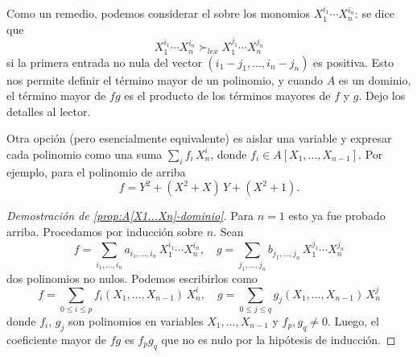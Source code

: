 Como un remedio, podemos considerar el  sobre los
monomios $X_1^{i_1}\cdots X_n^{i_n}$: se dice que
$$X_1^{i_1}\cdots X_n^{i_n} \succ_{lex} X_1^{j_1}\cdots X_n^{j_n}$$
si la primera entrada no nula del vector $(i_1-j_1,\ldots,i_n-j_n)$ es
positiva. Esto nos permite definir el término mayor de un polinomio, y cuando
$A$ es un dominio, el término mayor de $fg$ es el producto de los términos
mayores de $f$ y $g$. Dejo los detalles al lector.

Otra opción (pero esencialmente equivalente) es aislar una variable y expresar
cada polinomio como una suma $\sum_i f_i \, X_n^i$, donde
$f_i \in A [X_1,\ldots,X_{n-1}]$. Por ejemplo, para el polinomio de arriba
$$f = Y^2 + (X^2 + X)\,Y + (X^2 + 1).$$

\begin{proof}[Demostración de \ref{prop:A[X1...Xn]-dominio}]
  Para $n=1$ esto ya fue probado arriba. Procedamos por inducción sobre
  $n$. Sean
  $$f = \sum_{i_1,\ldots,i_n} a_{i_1,\ldots,i_n}\,X_1^{i_1}\cdots X_n^{i_n}, \quad g = \sum_{j_1,\ldots,j_n} b_{j_1,\ldots,j_n}\,X_1^{j_1}\cdots X_n^{j_n}$$
  dos polinomios no nulos. Podemos escribirlos como
  $$f = \sum_{0 \le i \le p} f_i (X_1,\ldots,X_{n-1})\,X_n^i, \quad g = \sum_{0 \le j \le q} g_j (X_1,\ldots,X_{n-1})\,X_n^j$$
  donde $f_i$, $g_j$ son polinomios en variables $X_1,\ldots,X_{n-1}$ y
  $f_p, g_q \ne 0$. Luego, el coeficiente mayor de $fg$ es $f_p g_q$ que no es
  nulo por la hipótesis de inducción.
\end{proof}

\iffalse
Notamos que si
$$X_1^{i_1}\cdots X_n^{i_n} \succ_{lex} X_1^{j_1}\cdots X_n^{j_n},$$
entonces
\begin{equation}
  \label{eqn:lex-orden-monomial}
  (X_1^{i_1}\cdots X_n^{i_n})\cdot (X_1^{k_1}\cdots X_n^{k_n}) \succ_{lex} (X_1^{j_1}\cdots X_n^{j_n})\cdot (X_1^{k_1}\cdots X_n^{k_n}).
\end{equation}
Para un polinomio no nulo
$$f = \sum_{i_1,\ldots,i_n} a_{i_1,\ldots,i_n}\,X_1^{i_1}\cdots X_n^{i_n} \in A [X_1,\ldots,X_n],$$
denotemos por
$$TM (f) \dfn \max \{ a_{i_1,\ldots,i_n}\,X_1^{i_1}\cdots X_n^{i_n} \mid a_{i_1,\ldots,i_n} \ne 0 \}$$
el \term{término mayor} respecto al orden lexicográfico.

\begin{proof}[Demostración de \ref{prop:A[X1...Xn]-dominio}]
  De nuevo, por inducción sobre el número de variables, tenemos
  $$\left(\sum_i f_i\,X^i\right)\,\left(\sum_j g_j\,X^j\right) = \sum_k \left(\sum_{i+j=k} f_i g_j\right)\,X_n^k = 1,$$
  de donde $f_0 g_0 = 1$ y $f_i g_j = 0$ para $i > 0$ o $j > 0$. Entonces,
  $f_i = g_j = 0$ para $i > 0$ o $j > 0$, mientras que $f_0$ y $g_0$ deben ser
  constantes por la hipótesis de inducción.
\end{proof}
\fi

